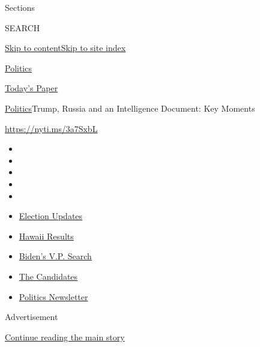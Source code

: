 Sections

SEARCH

\protect\hyperlink{site-content}{Skip to
content}\protect\hyperlink{site-index}{Skip to site index}

\href{https://www.nytimes.com/section/politics}{Politics}

\href{https://myaccount.nytimes.com/auth/login?response_type=cookie\&client_id=vi}{}

\href{https://www.nytimes.com/section/todayspaper}{Today's Paper}

\href{/section/politics}{Politics}\textbar{}Trump, Russia and an
Intelligence Document: Key Moments

\href{https://nyti.ms/3a7SxbL}{https://nyti.ms/3a7SxbL}

\begin{itemize}
\item
\item
\item
\item
\item
\end{itemize}

\begin{itemize}
\item
  \href{https://www.nytimes.com/2020/08/07/us/elections/biden-vs-trump.html?action=click\&pgtype=Article\&state=default\&region=TOP_BANNER\&context=storylines_menu}{Election
  Updates}
\item
  \href{https://www.nytimes.com/interactive/2020/08/08/us/elections/results-hawaii-primary-elections.html?action=click\&pgtype=Article\&state=default\&region=TOP_BANNER\&context=storylines_menu}{Hawaii
  Results}
\item
  \href{https://www.nytimes.com/article/biden-vice-president-2020.html?action=click\&pgtype=Article\&state=default\&region=TOP_BANNER\&context=storylines_menu}{Biden's
  V.P. Search}
\item
  \href{https://www.nytimes.com/interactive/2019/us/politics/2020-presidential-candidates.html?action=click\&pgtype=Article\&state=default\&region=TOP_BANNER\&context=storylines_menu}{The
  Candidates}
\item
  \href{https://www.nytimes.com/newsletters/politics?action=click\&pgtype=Article\&state=default\&region=TOP_BANNER\&context=storylines_menu}{Politics
  Newsletter}
\end{itemize}

Advertisement

\protect\hyperlink{after-top}{Continue reading the main story}

